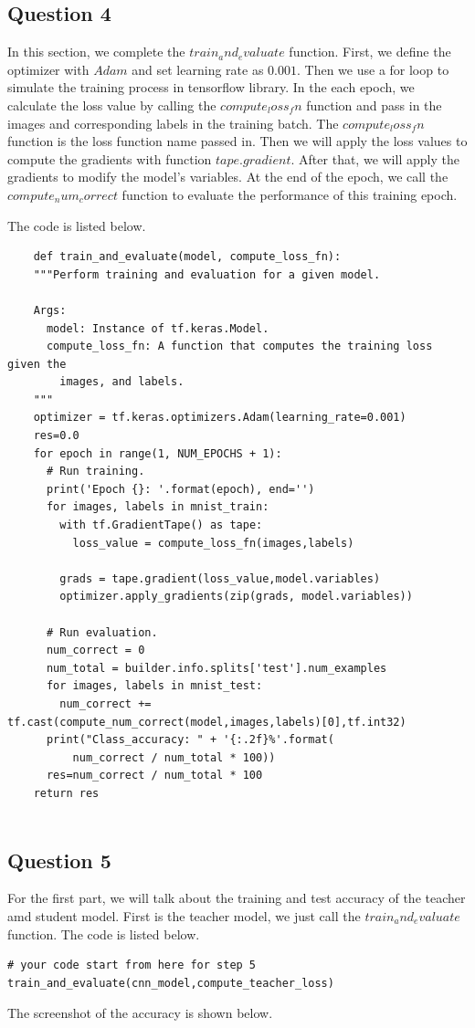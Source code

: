 \documentclass[conference]{IEEEtran}
\begin{document}
\subsection{Question 4}
In this section, we complete the $train_and_evaluate$ function.
First, we define the optimizer with $Adam$ and set learning rate as $0.001$.
Then we use a for loop to simulate the training process in tensorflow library.
In the each epoch, we calculate the loss value by calling the $compute_loss_fn$ function and pass in the images and corresponding labels in the training batch.
The $compute_loss_fn$ function is the loss function name passed in.
Then we will apply the loss values to compute the gradients with function $tape.gradient$. 
After that, we will apply the gradients to modify the model's variables.
At the end of the epoch, we call the $compute_num_correct$ function to evaluate the performance of this training epoch.\par
The code is listed below.
\begin{lstlisting}
    def train_and_evaluate(model, compute_loss_fn):
    """Perform training and evaluation for a given model.
  
    Args:
      model: Instance of tf.keras.Model.
      compute_loss_fn: A function that computes the training loss given the
        images, and labels.
    """
    optimizer = tf.keras.optimizers.Adam(learning_rate=0.001)
    res=0.0
    for epoch in range(1, NUM_EPOCHS + 1):
      # Run training.
      print('Epoch {}: '.format(epoch), end='')
      for images, labels in mnist_train:
        with tf.GradientTape() as tape:
          loss_value = compute_loss_fn(images,labels)
  
        grads = tape.gradient(loss_value,model.variables)
        optimizer.apply_gradients(zip(grads, model.variables))
  
      # Run evaluation.
      num_correct = 0
      num_total = builder.info.splits['test'].num_examples
      for images, labels in mnist_test:
        num_correct += tf.cast(compute_num_correct(model,images,labels)[0],tf.int32)
      print("Class_accuracy: " + '{:.2f}%'.format(
          num_correct / num_total * 100))
      res=num_correct / num_total * 100
    return res
      
\end{lstlisting}
\subsection{Question 5}
For the first part, we will talk about the training and test accuracy of the teacher amd student model.
First is the teacher model, we just call the $train_and_evaluate$ function. The code is listed below.
\begin{lstlisting}
# your code start from here for step 5 
train_and_evaluate(cnn_model,compute_teacher_loss)
\end{lstlisting}
The screenshot of the accuracy is shown below.
\end{document}
